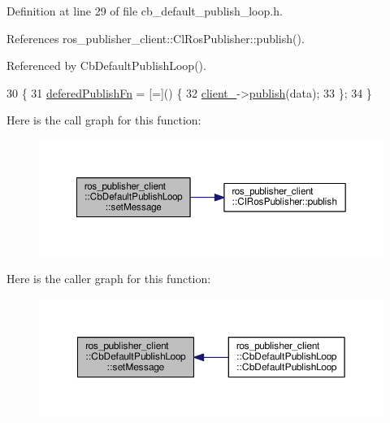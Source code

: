Definition at line 29 of file cb\+\_\+default\+\_\+publish\+\_\+loop.\+h.



References ros\+\_\+publisher\+\_\+client\+::\+Cl\+Ros\+Publisher\+::publish().



Referenced by Cb\+Default\+Publish\+Loop().


\begin{DoxyCode}
30     \{
31         \hyperlink{classros__publisher__client_1_1CbDefaultPublishLoop_a321f79f015449668a184cd30b6c2ad51}{deferedPublishFn} = [=]() \{
32             \hyperlink{classros__publisher__client_1_1CbDefaultPublishLoop_a90fc344876c742774a73542e338c3bfd}{client\_}->\hyperlink{classros__publisher__client_1_1ClRosPublisher_a9e62a3581a730cd2e287e560d04d151b}{publish}(data);
33         \};
34     \}
\end{DoxyCode}


Here is the call graph for this function\+:\nopagebreak
\begin{figure}[H]
\begin{center}
\leavevmode
\includegraphics[width=350pt]{classros__publisher__client_1_1CbDefaultPublishLoop_a8bba9039f6a6841c21e9bc89c2fd8ab7_cgraph}
\end{center}
\end{figure}




Here is the caller graph for this function\+:\nopagebreak
\begin{figure}[H]
\begin{center}
\leavevmode
\includegraphics[width=350pt]{classros__publisher__client_1_1CbDefaultPublishLoop_a8bba9039f6a6841c21e9bc89c2fd8ab7_icgraph}
\end{center}
\end{figure}


